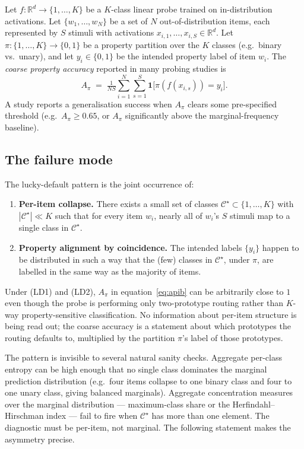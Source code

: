 \documentclass[11pt,letterpaper]{article}
\begin{document}
Let $f: \mathbb{R}^d \to \{1, \ldots, K\}$ be a $K$-class linear
probe trained on in-distribution activations. Let
$\{w_1, \ldots, w_N\}$ be a set of $N$ out-of-distribution items,
each represented by $S$ stimuli with activations
$x_{i,1}, \ldots, x_{i,S} \in \mathbb{R}^d$. Let
$\pi: \{1, \ldots, K\} \to \{0, 1\}$ be a property partition over
the $K$ classes (e.g.\ binary vs.\ unary), and let $y_i \in \{0, 1\}$
be the intended property label of item $w_i$. The \emph{coarse
property accuracy} reported in many probing studies is
\begin{equation}
  A_\pi
  \;=\;
  \tfrac{1}{N S}
  \sum_{i=1}^{N} \sum_{s=1}^{S}
  \mathbf{1}\bigl[\pi(f(x_{i,s})) = y_i\bigr].
  \label{eq:apib}
\end{equation}
A study reports a generalisation success when $A_\pi$ clears some
pre-specified threshold (e.g.\ $A_\pi \geq 0.65$, or $A_\pi$
significantly above the marginal-frequency baseline).

\subsection{The failure mode}

The lucky-default pattern is the joint occurrence of:
\begin{enumerate}[label=\textbf{(LD\arabic*)},leftmargin=2.4em]
  \item \textbf{Per-item collapse.} There exists a small set of
        classes $\mathcal{C}^\star \subset \{1, \ldots, K\}$ with
        $|\mathcal{C}^\star| \ll K$ such that for every item $w_i$,
        nearly all of $w_i$'s $S$ stimuli map to a single class in
        $\mathcal{C}^\star$.
  \item \textbf{Property alignment by coincidence.} The intended
        labels $\{y_i\}$ happen to be distributed in such a way that
        the (few) classes in $\mathcal{C}^\star$, under $\pi$, are
        labelled in the same way as the majority of items.
\end{enumerate}
Under (LD1) and (LD2), $A_\pi$ in equation~\eqref{eq:apib} can be
arbitrarily close to $1$ even though the probe is performing only
two-prototype routing rather than $K$-way property-sensitive
classification. No information about per-item structure is being
read out; the coarse accuracy is a statement about which prototypes
the routing defaults to, multiplied by the partition $\pi$'s label
of those prototypes.

The pattern is invisible to several natural sanity checks. Aggregate
per-class entropy can be high enough that no single class dominates
the marginal prediction distribution (e.g.\ four items collapse to
one binary class and four to one unary class, giving balanced
marginals). Aggregate concentration measures over the marginal
distribution --- maximum-class share or the
Herfindahl--Hirschman index \citep{hirschman1964hhi} ---
fail to fire when $\mathcal{C}^\star$ has more than one element. The
diagnostic must be per-item, not marginal. The following statement
makes the asymmetry precise.
\end{document}
